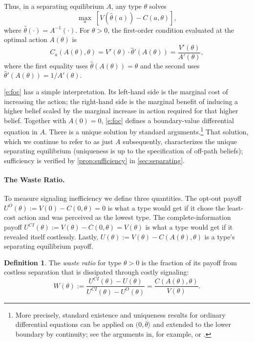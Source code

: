 \documentclass[12 pt]{article}
\theoremstyle{remark}
\theoremstyle{definition}
\newtheorem{definition}{Definition}
\def\typemin{0}
\def\typemax{\overline \theta}
\let\oldfootnote\footnote
\renewcommand\footnote[1]{\oldfootnote{\hspace{.5mm}#1}}
\begin{document}
Thus, in a separating equilibrium $A$, any type $\theta$ solves
\[
\max_a \; [V(\hat\theta(a)) - C(a, \theta)],
\]
where $\hat \theta(\cdot)=A^{-1}(\cdot)$. 
For $\theta>0$, the first-order condition  evaluated at the optimal action $A(\theta)$ is
\begin{equation}\label{e:foc}
C_a(A(\theta), \theta) = V'(\theta) \cdot \hat\theta'(A(\theta)) = \frac{V'(\theta)}{A'(\theta)},
\end{equation}
where the first equality uses $\hat \theta(A(\theta))=\theta$ and the second uses $\hat\theta'(A(\theta)) = 1/A'(\theta)$.

\autoref{e:foc} has a simple interpretation. Its left-hand side is the marginal cost of increasing the action; the right-hand side is the marginal benefit of inducing a higher belief scaled by the marginal increase in action required for that higher belief. Together with $A(\typemin) = 0$, \autoref{e:foc} defines a boundary-value differential equation in $A$. There is a unique solution by standard arguments.\footnote{More precisely, standard existence and uniqueness results for ordinary differential equations can be applied on $(\typemin,\typemax\rangle$ and extended to the lower boundary by continuity; see the arguments in, for example, \citet{Mailath87} or \citet{Kartik09}.} That solution, which we continue to refer to as just $A$ subsequently, characterizes the unique separating equilibrium (uniqueness is up to the specification of off-path beliefs); sufficiency is verified by \autoref{prop:sufficiency} in \autoref{sec:separating}.

\paragraph{The Waste Ratio.} To measure signaling inefficiency we define three quantities. The {opt-out} payoff $U^{O}(\theta):=V(\typemin)-C(0,\theta)=0$ is what a type would get if it chose the least-cost action and was perceived as the lowest type. The {complete-information} payoff $U^{CI}(\theta):=V(\theta)-C(0,\theta)=V(\theta)$ is what a type would get if it revealed itself costlessly. Lastly, $U(\theta):=V(\theta) - C(A(\theta), \theta)$ is a type's separating {equilibrium payoff}.

\begin{definition}
\label{def:waste}
The \emph{waste ratio} for type $\theta>0$ is the fraction of its payoff from costless separation that is dissipated through costly signaling:%
\begin{equation}
\label{e:waste}    
W(\theta) := \frac{U^{CI}(\theta) - U(\theta)}{U^{CI}(\theta) - U^O(\theta)} = \frac{C(A(\theta), \theta)}{V(\theta)}.
\end{equation}
\end{definition}
\end{document}
